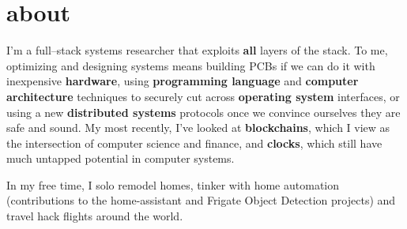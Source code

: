 \section{about}

I'm a full--stack systems researcher that exploits \textbf{all} layers of the stack. To me, 
optimizing and designing systems means building PCBs if we can do it with inexpensive \textbf{hardware},
using \textbf{programming language} and \textbf{computer architecture} techniques to securely cut across \textbf{operating system} interfaces,
or using a new \textbf{distributed systems} protocols once we convince ourselves they are safe and sound. My
most recently, I've looked at \textbf{blockchains}, which I view as the intersection of computer science
and finance, and \textbf{clocks}, which still have much untapped potential in computer systems.

In my free time, I solo remodel homes, tinker with home automation 
(contributions to the home-assistant and Frigate Object Detection projects) and travel hack 
flights around the world.


\clearpage















%




